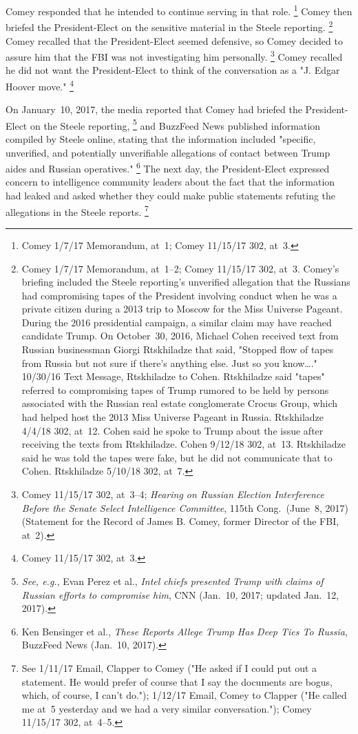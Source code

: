 Comey responded that he intended to continue serving in that role.%
\footnote{Comey 1/7/17 Memorandum, at~1;
Comey 11/15/17 302, at~3.}
Comey then briefed the President-Elect on the sensitive material in the Steele reporting.%
\footnote{Comey 1/7/17 Memorandum, at~1--2;
Comey 11/15/17 302, at~3.
Comey's briefing included the Steele reporting's unverified allegation that the Russians had compromising tapes of the President involving conduct when he was a private citizen during a 2013 trip to Moscow for the Miss Universe Pageant.
During the 2016 presidential campaign, a similar claim may have reached candidate Trump.
On October~30, 2016, Michael Cohen received text from Russian businessman Giorgi Rtskhiladze that said, "Stopped flow of tapes from Russia but not sure if there's anything else.
Just so you know\dots." 10/30/16 Text Message, Rtskhiladze to Cohen.
Rtskhiladze said "tapes" referred to compromising tapes of Trump rumored to be held by persons associated with the Russian real estate conglomerate Crocus Group, which had helped host the 2013 Miss Universe Pageant in Russia.
Rtskhiladze 4/4/18 302, at~12.
Cohen said he spoke to Trump about the issue after receiving the texts from Rtskhiladze.
Cohen 9/12/18 302, at~13.
Rtskhiladze said he was told the tapes were fake, but he did not communicate that to Cohen.
Rtskhiladze 5/10/18 302, at~7.}
Comey recalled that the President-Elect seemed defensive, so Comey decided to assure him that the FBI was not investigating him personally.%
\footnote{Comey 11/15/17 302, at~3--4;
\textit{Hearing on Russian Election Interference Before the Senate Select Intelligence Committee}, 115th Cong.\ (June~8, 2017) (Statement for the Record of James B. Comey, former Director of the FBI, at~2).}
Comey recalled he did not want the President-Elect to think of the conversation as a "J. Edgar Hoover move."%
\footnote{Comey 11/15/17 302, at~3.}

On January~10, 2017, the media reported that Comey had briefed the President-Elect on the Steele reporting,%
\footnote{\textit{See, e.g.}, Evan Perez et al., \textit{Intel chiefs presented Trump with claims of Russian efforts to compromise him}, CNN (Jan.~10, 2017;
updated Jan.~12, 2017).}
and BuzzFeed News published information compiled by Steele online, stating that the information included "specific, unverified, and potentially unverifiable allegations of contact between Trump aides and Russian operatives."%
\footnote{Ken Bensinger et al., \textit{These Reports Allege Trump Has Deep Ties To Russia}, BuzzFeed News (Jan.~10, 2017).}
The next day, the President-Elect expressed concern to intelligence community leaders about the fact that the information had leaked and asked whether they could make public statements refuting the allegations in the Steele reports.%
\footnote{See 1/11/17 Email, Clapper to Comey ("He asked if I could put out a statement.
He would prefer of course that I say the documents are bogus, which, of course, I can't do.");
1/12/17 Email, Comey to Clapper ("He called me at~5 yesterday and we had a very similar conversation.");
Comey 11/15/17 302, at~4--5.}

